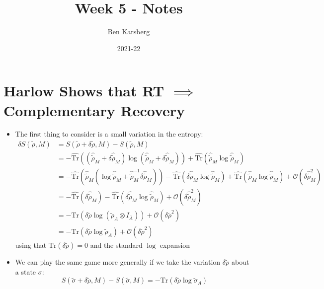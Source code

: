 \documentclass[12pt,a4paper]{article}
\title{Week 5 - Notes}
\author{Ben Karsberg}
\date{2021-22}
\numberwithin{equation}{section}
\theoremstyle{definition}
\theoremstyle{theorem}
\theoremstyle{example}
\begin{document}
	\maketitle
	\section{Harlow Shows that RT $\implies$ Complementary Recovery}
	\begin{itemize}
		\item The first thing to consider is a small variation in the entropy:
		\begin{equation}
			\begin{aligned}
				\delta S(\tilde{\rho},M)&=S(\tilde{\rho}+\delta\tilde{\rho},M)-S(\tilde{\rho},M)\\&=-\hat{\text{Tr}}\left(\left(\hat{\tilde{\rho}}_{M}+\delta\hat{\tilde{\rho}}_{M}\right)\log\left(\hat{\tilde{\rho}}_{M}+\delta\hat{\tilde{\rho}}_{M}\right)\right)+\hat{\text{Tr}}\left(\hat{\tilde{\rho}}_{M}\log{\hat{\tilde{\rho}}_{M}}\right)\\&=-\hat{\text{Tr}}\left(\hat{\tilde{\rho}}_{M}\left(\log{\hat{\tilde{\rho}}_{M}}+\hat{\tilde{\rho}}_{M}^{-1}\delta\hat{\tilde{\rho}}_{M}\right)\right)-\hat{\text{Tr}}\left(\delta\hat{\tilde{\rho}}_{M}\log{\hat{\tilde{\rho}}_{M}}\right)+\hat{\text{Tr}}\left(\hat{\tilde{\rho}}_{M}\log\hat{\tilde{\rho}}_{M}\right)+\mathcal{O}\left(\delta\hat{\tilde{\rho}}_{M}^{2}\right)\\&=-\hat{\text{Tr}}\left(\delta\hat{\tilde{\rho}}_{M}\right)-\hat{\text{Tr}}\left(\delta\hat{\tilde{\rho}}_{M}\log\hat{\tilde{\rho}}_{M}\right)+\mathcal{O}\left(\delta\hat{\tilde{\rho}}_{M}^{2}\right)\\&=-\text{Tr}\left(\delta\tilde{\rho}\log\left(\tilde{\rho}_{A}\otimes I_{\overline{A}}\right)\right)+\mathcal{O}\left(\delta\tilde{\rho}^{2}\right)\\&=-\text{Tr}\left(\delta\tilde{\rho}\log\tilde{\rho}_{A}\right)+\mathcal{O}\left(\delta\tilde{\rho}^{2}\right)
			\end{aligned}
		\end{equation}
		using that $\text{Tr}(\delta\tilde{\rho})=0$ and the standard $\log$ expansion
		\item We can play the same game more generally if we take the variation $\delta\tilde{\rho}$ about a state $\sigma$:
		\begin{equation}
			S(\tilde{\sigma}+\delta\tilde{\rho},M)-S(\tilde{\sigma},M)=-\text{Tr}\left(\delta\tilde{\rho}\log\tilde{\sigma}_{A}\right)
		\end{equation}

\end{itemize}
\end{document}
